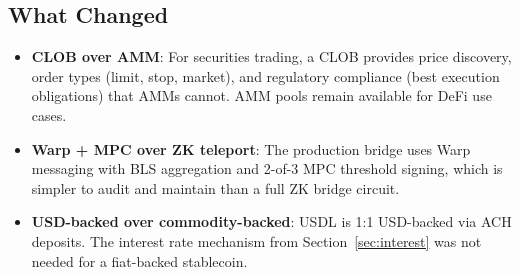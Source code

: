\subsection{What Changed}

\begin{itemize}[nosep]
  \item \textbf{CLOB over AMM}: For securities trading, a CLOB provides
        price discovery, order types (limit, stop, market), and
        regulatory compliance (best execution obligations) that AMMs
        cannot. AMM pools remain available for DeFi use cases.
  \item \textbf{Warp + MPC over ZK teleport}: The production bridge
        uses Warp messaging with BLS aggregation and 2-of-3 MPC
        threshold signing, which is simpler to audit and maintain than
        a full ZK bridge circuit.
  \item \textbf{USD-backed over commodity-backed}: USDL is 1:1
        USD-backed via ACH deposits. The interest rate mechanism
        from Section~\ref{sec:interest} was not needed for a
        fiat-backed stablecoin.
\end{itemize}

